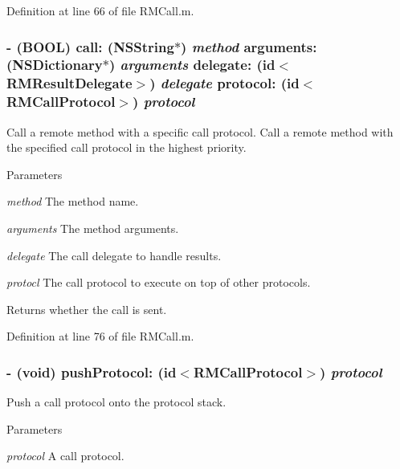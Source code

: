 Definition at line 66 of file RMCall.m.\hypertarget{interface_r_m_call_ae6750e4bc12f50170b839e1b96227a87}{
\subsubsection[{call:arguments:delegate:protocol:}]{\setlength{\rightskip}{0pt plus 5cm}-\/ (BOOL) call: ({\bf NSString}$\ast$) {\em method}\/ arguments: (NSDictionary$\ast$) {\em arguments}\/ delegate: (id$<${\bf RMResultDelegate}$>$) {\em delegate}\/ protocol: (id$<${\bf RMCallProtocol}$>$) {\em protocol}}}
\label{interface_r_m_call_ae6750e4bc12f50170b839e1b96227a87}


Call a remote method with a specific call protocol. Call a remote method with the specified call protocol in the highest priority.


\begin{DoxyParams}{Parameters}
\item[{\em method}]The method name. \item[{\em arguments}]The method arguments. \item[{\em delegate}]The call delegate to handle results. \item[{\em protocl}]The call protocol to execute on top of other protocols.\end{DoxyParams}
\begin{DoxyReturn}{Returns}
whether the call is sent. 
\end{DoxyReturn}


Definition at line 76 of file RMCall.m.\hypertarget{interface_r_m_call_afb23a22f89df78e62f45f2af2dd41623}{
\subsubsection[{pushProtocol:}]{\setlength{\rightskip}{0pt plus 5cm}-\/ (void) pushProtocol: (id$<${\bf RMCallProtocol}$>$) {\em protocol}}}
\label{interface_r_m_call_afb23a22f89df78e62f45f2af2dd41623}


Push a call protocol onto the protocol stack. 
\begin{DoxyParams}{Parameters}
\item[{\em protocol}]A call protocol. \end{DoxyParams}


